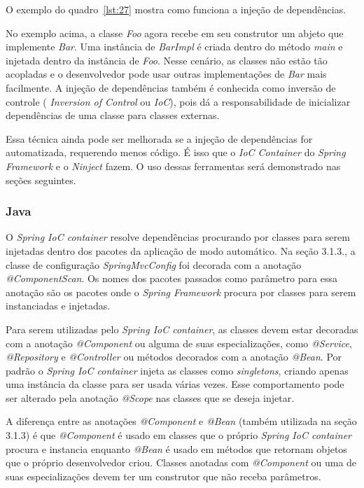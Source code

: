 \documentclass[a4paper,12pt]{article}
\newcommand{\est}[1] {
\textit{#1}}
\newcommand{\classe}[1] {
\textit{#1}}
\newcommand{\sigla}[1] {
\textit{#1}}
\newcommand{\annotation}[1] {
\textit{#1}}
\newcommand{\metodo}[1] {
\textit{#1}}
\newcommand{\javacode}[3] {
	
}
\begin{document}
O exemplo do quadro~\ref{lst:27} mostra como funciona a injeção de dependências.

\javacode{code/27.txt}{Exemplo de classes fracamente acopladas}{lst:27}

No exemplo acima, a classe \classe{Foo} agora recebe em seu construtor um abjeto que implemente \classe{Bar}. Uma instância de \classe{BarImpl} é criada dentro do método \metodo{main} e injetada dentro da instância de \classe{Foo}. Nesse cenário, as classes não estão tão acopladas e o desenvolvedor pode usar outras implementações de \classe{Bar} mais facilmente. A injeção de dependências também é conhecida como inversão de controle (\est{Inversion of Control} ou \sigla{IoC}), pois dá a responsabilidade de inicializar dependências de uma classe para classes externas. 

Essa técnica ainda pode ser melhorada se a injeção de dependências for automatizada, requerendo menos código. É isso que o \est{IoC Container} do \est{Spring Framework} e o \est{Ninject} fazem. O uso dessas ferramentas será demonstrado nas seções seguintes.

\subsubsection{Java}

O \est{Spring IoC container} resolve dependências procurando por classes para serem injetadas dentro dos pacotes da aplicação de modo automático. Na seção 3.1.3., a classe de configuração \classe{SpringMvcConfig} foi decorada com a anotação \annotation{@ComponentScan}. Os nomes dos pacotes passados como parâmetro para essa anotação são os pacotes onde o \est{Spring Framework} procura por classes para serem instanciadas e injetadas.

Para serem utilizadas pelo \est{Spring IoC container}, as classes devem estar decoradas com a anotação \annotation{@Component} ou alguma de suas especializações, como \annotation{@Service}, \annotation{@Repository} e \annotation{@Controller} ou métodos decorados com a anotação \annotation{@Bean}. Por padrão o \est{Spring IoC container} injeta as classes como \est{singletons}, criando apenas uma instância da classe para ser usada várias vezes. Esse comportamento pode ser alterado pela anotação \annotation{@Scope} nas classes que se deseja injetar.

A diferença entre as anotações \annotation{@Component} e \annotation{@Bean} (também utilizada na seção 3.1.3) é que \annotation{@Component} é usado em classes que o próprio \est{Spring IoC container} procura e instancia enquanto \annotation{@Bean} é usado em métodos que retornam objetos que o próprio desenvolvedor criou. Classes anotadas com \annotation{@Component} ou uma de suas especializações devem ter um construtor que não receba parâmetros.
\end{document}
